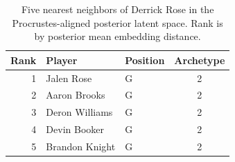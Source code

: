 \begin{table}[htbp]
  \centering\small
  \begin{tabular}{rllc}
    \toprule
    Rank & Player & Position & Archetype \\
    \midrule
    1 & Jalen Rose & G & 2 \\
    2 & Aaron Brooks & G & 2 \\
    3 & Deron Williams & G & 2 \\
    4 & Devin Booker & G & 2 \\
    5 & Brandon Knight & G & 2 \\
    \bottomrule
  \end{tabular}
  \caption{Five nearest neighbors of Derrick Rose in the Procrustes-aligned posterior latent space. Rank is by posterior mean embedding distance.}
  \label{tab:Derrick_Rose_neighbors}
\end{table}


